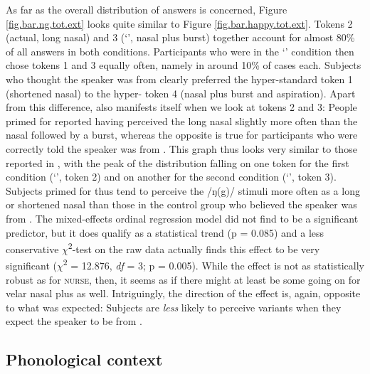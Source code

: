 As far as the overall distribution of answers is concerned, Figure \ref{fig.bar.ng.tot.ext} looks quite similar to Figure \ref{fig.bar.happy.tot.ext}.
Tokens 2 (actual, long nasal) and 3 (`', nasal plus burst) together account for almost 80\% of all answers in both conditions.
Participants who were in the `' condition then chose tokens 1 and 3 equally often, namely in around 10\% of cases each.
Subjects who thought the speaker was from  clearly preferred the hyper-standard token 1 (shortened nasal) to the hyper- token 4 (nasal plus burst and aspiration).
Apart from this difference,  also manifests itself when we look at tokens 2 and 3: People primed for  reported having perceived the long nasal slightly more often than the nasal followed by a burst, whereas the opposite is true for participants who were correctly told the speaker was from .
This graph thus looks very similar to those reported in \textcite{hayetal2006a, haydrager2010}, with the peak of the distribution falling on one token for the first condition (`', token 2) and on another for the second condition (`', token 3).
Subjects primed for  thus tend to perceive the /ŋ(g)/ stimuli more often as a long or shortened nasal than those in the control group who believed the speaker was from .
The mixed-effects ordinal regression model did not find  to be a significant predictor, but it does qualify as a statistical trend (p = 0.085) and a less conservative \(\chi\)\textsuperscript{2}-test on the raw data actually finds this effect to be very significant (\(\chi\)\textsuperscript{2} = 12.876, \emph{df} = 3; p = 0.005).
While the effect is not as statistically robust as for \textsc{nurse}, then, it seems as if there might at least be some  going on for velar nasal plus as well.
Intriguingly, the direction of the effect is, again, opposite to what was expected: Subjects are \emph{less} likely to perceive  variants when they expect the speaker to be from .

\subsection{Phonological context}
\label{sec.perc_res.ng.phon}

